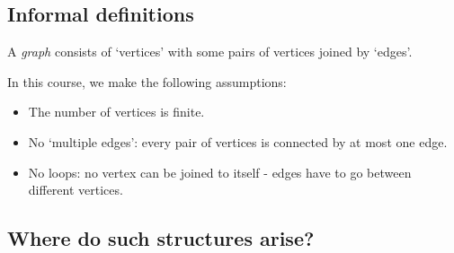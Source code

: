\documentclass{article}
\begin{document}
\subsection{Informal definitions}
A \emph{graph} consists of `vertices' with some pairs of vertices joined by `edges'.
\begin{center}
\end{center}
In this course, we make the following assumptions:
\begin{itemize}
    \item The number of vertices is finite.
    \item No `multiple edges': every pair of vertices is connected by at most one edge.
    \item No loops: no vertex can be joined to itself - edges have to go between different vertices.
\end{itemize}

\subsection{Where do such structures arise?}
\end{document}
